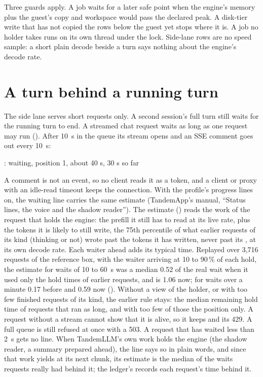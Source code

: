 Three guards apply. A job waits for a later safe point when the engine's memory plus the guest's copy and workspace would pass the declared peak. A disk-tier write that has not copied the rows below the guest yet stops where it is. A job no holder takes runs on its own thread under the lock. Side-lane rows are no speed sample: a short plain decode beside a turn says nothing about the engine's decode rate.

\section{A turn behind a running turn}

The side lane serves short requests only. A second session's full turn still waits for the running turn to end. A streamed chat request waits as long as one request may run (). After 10~s in the queue its stream opens and an SSE comment goes out every 10~s:

\begin{plain}
: waiting, position 1, about 40 s, 30 s so far
\end{plain}

A comment is not an event, so no client reads it as a token, and a client or proxy with an idle-read timeout keeps the connection. With the profile's progress lines on, the waiting line carries the same estimate (TandemApp's manual, \enquote{Status lines, the voice and the shadow reader}). The estimate () reads the work of the request that holds the engine: the prefill it still has to read at its live rate, plus the tokens it is likely to still write, the 75th percentile of what earlier requests of its kind (thinking or not) wrote past the tokens it has written, never past its , at its own decode rate. Each waiter ahead adds its typical time. Replayed over 3,716 requests of the reference box, with the waiter arriving at 10 to 90\,\% of each hold, the estimate for waits of 10 to 60~s was a median 0.52 of the real wait when it used only the hold times of earlier requests, and is 1.06 now; for waits over a minute 0.17 before and 0.59 now (\measured). Without a view of the holder, or with too few finished requests of its kind, the earlier rule stays: the median remaining hold time of requests that ran as long, and with too few of those the position only. A request without a stream cannot show that it is alive, so it keeps  and its 429. A full queue is still refused at once with a 503. A request that has waited less than 2~s gets no line. When TandemLLM's own work holds the engine (the shadow reader, a summary prepared ahead), the line says so in plain words, and since that work yields at its next chunk, its estimate is the median of the waits requests really had behind it; the ledger's  records each request's time behind it.

